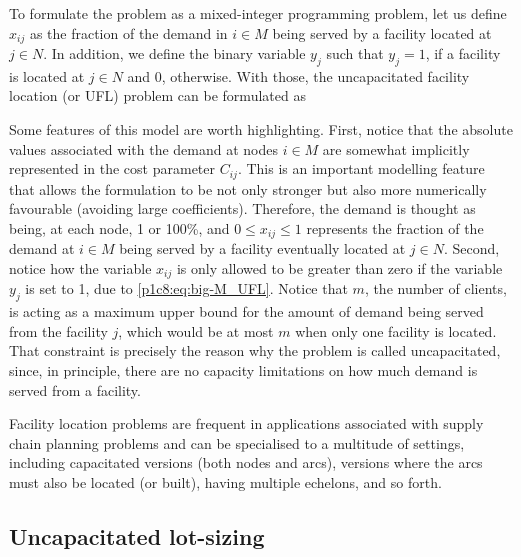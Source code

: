 To formulate the problem as a mixed-integer programming problem, let us define $x_{ij}$ as the fraction of the demand in $i \in M$ being served by a facility located at $j \in N$. In addition, we define the binary variable $y_j$ such that $y_j = 1$, if a facility is located at $j \in N$ and 0, otherwise. With those, the uncapacitated facility location (or UFL) problem can be formulated as 
%

Some features of this model are worth highlighting. First, notice that the absolute values associated with the demand at nodes $i \in M$ are somewhat implicitly represented in the cost parameter $C_{ij}$. This is an important modelling feature that allows the formulation to be not only stronger but also more numerically favourable (avoiding large coefficients). Therefore, the demand is thought as being, at each node, 1 or 100\%, and $0 \le x_{ij} \le 1$ represents the fraction of the demand at $i \in M$ being served by a facility eventually located at $j \in N$. Second, notice how the variable $x_{ij}$ is only allowed to be greater than zero if the variable $y_j$ is set to 1, due to \eqref{p1c8:eq:big-M_UFL}. Notice that $m$, the number of clients, is acting as a maximum upper bound for the amount of demand being served from the facility $j$, which would be at most $m$ when only one facility is located. That constraint is precisely the reason why the problem is called uncapacitated, since, in principle, there are no capacity limitations on how much demand is served from a facility. 

Facility location problems are frequent in applications associated with supply chain planning problems and can be specialised to a multitude of settings, including capacitated versions (both nodes and arcs), versions where the arcs must also be located (or built), having multiple echelons, and so forth. 

 
\subsection{Uncapacitated lot-sizing}

